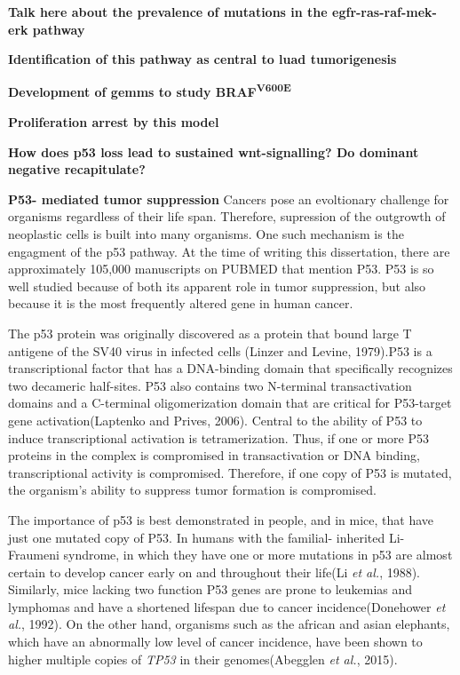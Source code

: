 \textbf{Talk here about the prevalence of mutations in the egfr-ras-raf-mek-erk pathway}

\textbf{Identification of this pathway as central to luad tumorigenesis}

\textbf{Development of gemms to study BRAF\textsuperscript{V600E}}

\textbf{Proliferation arrest by this model}

\textbf{How does p53 loss lead to sustained wnt-signalling? Do dominant negative recapitulate?}

\textbf{P53- mediated tumor suppression}
Cancers pose an evoltionary challenge for organisms regardless of their life span. Therefore, supression of the outgrowth of neoplastic cells is built into many organisms. One such mechanism is the engagment of the p53 pathway. At the time of writing this dissertation, there are approximately 105,000 manuscripts on PUBMED that mention P53. P53 is so well studied because of both its apparent role in tumor suppression, but also because it is the most frequently altered gene in human cancer.

The p53 protein was originally discovered as a protein that bound large T antigene of the SV40 virus in infected cells (Linzer and Levine, 1979).P53 is a transcriptional factor that has a DNA-binding domain that specifically recognizes two decameric half-sites. P53 also contains two N-terminal transactivation domains and a C-terminal oligomerization domain that are critical for P53-target gene activation(Laptenko and Prives, 2006). Central to the ability of P53 to induce transcriptional activation is tetramerization. Thus, if one or more P53 proteins in the complex is compromised in transactivation or DNA binding, transcriptional activity is compromised. Therefore, if one copy of P53 is mutated, the organism's ability to suppress tumor formation is compromised.

The importance of p53 is best demonstrated in people, and in mice, that have just one mutated copy of P53. In humans with the familial- inherited Li-Fraumeni syndrome, in which they have one or more mutations in p53 are almost certain to develop cancer early on and throughout their life(Li \emph{et al.}, 1988). Similarly, mice lacking two function P53 genes are prone to leukemias and lymphomas and have a shortened lifespan due to cancer incidence(Donehower \emph{et al.}, 1992). On the other hand, organisms such as the african and asian elephants, which have an abnormally low level of cancer incidence, have been shown to higher multiple copies of \emph{TP53} in their genomes(Abegglen \emph{et al.}, 2015).


